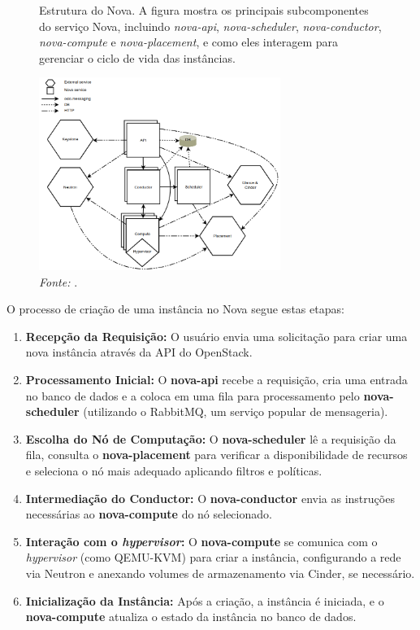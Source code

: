 \begin{figure}[htbp]
  \centering
  \caption{Estrutura do Nova. A figura mostra os principais subcomponentes do serviço Nova, incluindo \textit{nova-api}, \textit{nova-scheduler}, \textit{nova-conductor}, \textit{nova-compute} e \textit{nova-placement}, e como eles interagem para gerenciar o ciclo de vida das instâncias.}
  \includegraphics[width=0.7\textwidth]{images/nova_structure.png}
  \caption*{\textit{Fonte:} \citep{DocumentacaoOpenstack}.}
  \label{fig:nova_structure}
\end{figure}


O processo de criação de uma instância no Nova segue estas etapas:

\begin{enumerate}
    \item \textbf{Recepção da Requisição:} O usuário envia uma solicitação para criar uma nova instância através da API do OpenStack.
    \item \textbf{Processamento Inicial:} O \textbf{nova-api} recebe a requisição, cria uma entrada no banco de dados e a coloca em uma fila para processamento pelo \textbf{nova-scheduler} (utilizando o RabbitMQ, um serviço popular de mensageria).
    \item \textbf{Escolha do Nó de Computação:} O \textbf{nova-scheduler} lê a requisição da fila, consulta o \textbf{nova-placement} para verificar a disponibilidade de recursos e seleciona o nó mais adequado aplicando filtros e políticas.
    \item \textbf{Intermediação do Conductor:} O \textbf{nova-conductor} envia as instruções necessárias ao \textbf{nova-compute} do nó selecionado.
    \item \textbf{Interação com o \textit{hypervisor}:} O \textbf{nova-compute} se comunica com o \textit{hypervisor} (como QEMU-KVM) para criar a instância, configurando a rede via Neutron e anexando volumes de armazenamento via Cinder, se necessário.
    \item \textbf{Inicialização da Instância:} Após a criação, a instância é iniciada, e o \textbf{nova-compute} atualiza o estado da instância no banco de dados.
\end{enumerate}


